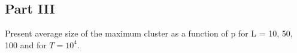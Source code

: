 \documentclass[11pt]{article}
\begin{document}
    \subsection{Part III}
    \label{subsec:part-c}
    Present average size of the maximum cluster as a function of p for L = 10, 50, 100 and for $T = 10^4$.
    \begin{figure}[H]
        \centering
        \bigskip
\end{figure}
\end{document}
